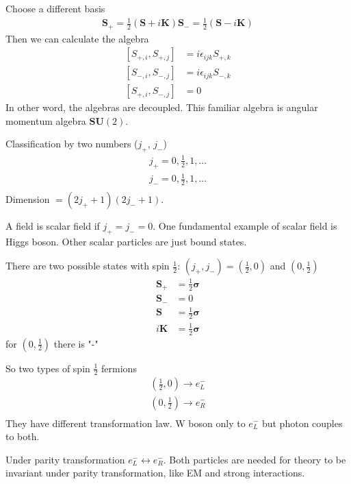 Choose a different basis
\begin{align}
   \pmb{S}_+ = \frac{1}{2} \left( \pmb{S} + i \pmb{K} \right) 
   \pmb{S}_- = \frac{1}{2} \left( \pmb{S} - i \pmb{K} \right) 
\end{align}
Then we can calculate the algebra
\begin{align}
   \left[ S_{+, i}, S_{+, j} \right] &= i \epsilon_{ijk} S_{+, k} \\
   \left[ S_{-, i}, S_{-, j} \right] &= i \epsilon_{ijk} S_{-, k} \\
   \left[ S_{+, i}, S_{-, j} \right] &= 0
\end{align}
In other word, the algebras are decoupled. This familiar algebra is angular momentum algebra $\mathbf{SU}(2)$.

Classification by two numbers ($j_+$, $j_-$)
\begin{align*}
   j_+ = 0, \frac{1}{2}, 1, \dots \\
   j_- = 0, \frac{1}{2}, 1, \dots \\
\end{align*}
Dimension $=(2j_+ + 1) (2j_- + 1)$. 

A field is scalar field if $j_+ = j_- = 0$. One fundamental example of scalar field is Higgs boson. Other scalar particles are just bound states.

There are two possible states with spin $\frac{1}{2}$: $(j_+, j_-) = (\frac{1}{2}, 0)$ and $(0, \frac{1}{2})$
\begin{align*}
   \pmb{S}_+ &= \frac{1}{2} \pmb{\sigma} \\
   \pmb{S}_- &= 0 \\
   \pmb{S} &= \frac{1}{2} \pmb{\sigma} \\
   i\pmb{K} &=  \frac{1}{2} \pmb{\sigma} 
\end{align*}
for $(0, \frac{1}{2})$ there is "-"

So two types of spin $\frac{1}{2}$ fermions
\begin{align*}
   \left(\frac{1}{2}, 0\right) \rightarrow e^-_L \\
   \left(0, \frac{1}{2}\right) \rightarrow e^-_R \\
\end{align*}
They have different transformation law. W boson only to $e^-_L$ but photon couples to both. 

Under parity transformation $e^-_L \leftrightarrow e^-_R$. Both particles are needed for theory to be invariant under parity transformation, like EM and strong interactions.
